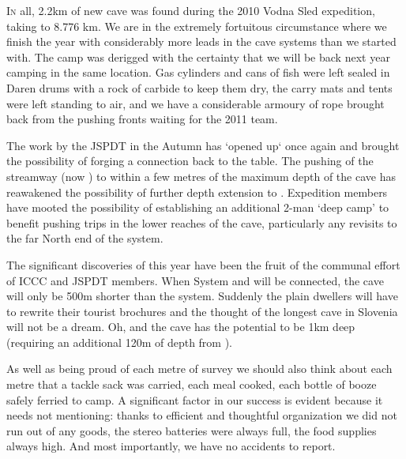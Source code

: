 \thispagestyle{endchapter}

\begin{tcolorbox}
\vspace{80pt}

\lettrine{I}{n} all, 2.2km of new cave was found during the 2010 Vodna Sled expedition, taking  to 8.776 km. We are in the extremely fortuitous circumstance where we finish the year with considerably more leads in the  cave systems
than we started with. The  camp was derigged with the certainty that we will be back next year camping in the same location. Gas cylinders and cans of fish were left sealed in Daren drums with
a rock of carbide to keep them dry, the carry mats and tents were left standing to air, and we have a considerable armoury of rope brought back from the pushing fronts waiting for the 2011 team.

The work by the JSPDT in the Autumn has ‘opened up‘  once again and brought the possibility of forging a connection back to the table. The pushing of the  streamway (now ) to within
a few metres of the maximum depth of the cave has reawakened the possibility of further depth extension to . Expedition members have mooted the possibility of establishing an additional 2-man
‘deep camp’ to benefit pushing trips in the lower reaches of the cave, particularly any revisits to the far North end of the system.

The significant discoveries of this year have been the fruit of the communal effort of ICCC and JSPDT members. When System  and  will be connected, the cave will only be 500m shorter than the
 system. Suddenly the plain dwellers will have to rewrite their tourist brochures and the thought of the longest cave in Slovenia will not be a dream. Oh, and the cave has the potential to be 1km
deep (requiring an additional 120m of depth from ).

As well as being proud of each metre of survey we should also think about each metre that a tackle sack was carried, each meal cooked, each bottle of booze safely ferried to camp. A significant factor in our success is evident because it needs not mentioning: thanks to efficient and thoughtful organization we did not run out of any goods, the stereo batteries were always full, the food supplies always high. And most importantly, we have no accidents to report.

\end{tcolorbox}
